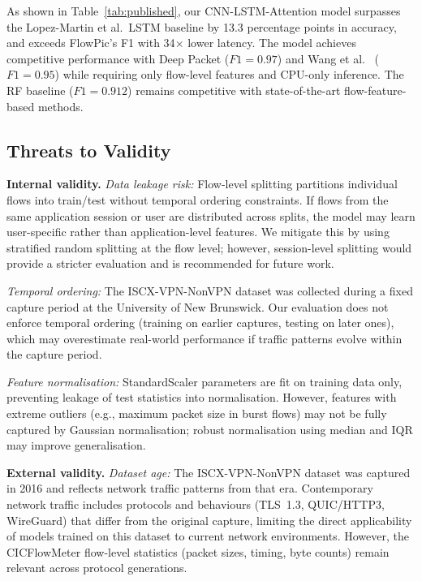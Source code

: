 \documentclass[conference]{IEEEtran}
\begin{document}
As shown in Table~\ref{tab:published}, our CNN-LSTM-Attention model surpasses
the Lopez-Martin et al.\ LSTM baseline \cite{lopezmartin2017} by 13.3 percentage
points in accuracy, and exceeds FlowPic's F1 \cite{shapira2021} with
34$\times$ lower latency. The model achieves competitive performance with
Deep Packet \cite{lotfollahi2020} ($F1 = 0.97$) and Wang et al.\ \cite{wang2024}
($F1 = 0.95$) while requiring only flow-level features and CPU-only inference.
The RF baseline ($F1 = 0.912$) remains competitive with state-of-the-art
flow-feature-based methods.

\subsection{Threats to Validity}
\label{ssec:threats}

\textbf{Internal validity.}
\textit{Data leakage risk:} Flow-level splitting partitions individual flows
into train/test without temporal ordering constraints. If flows from the same
application session or user are distributed across splits, the model may learn
user-specific rather than application-level features. We mitigate this by using
stratified random splitting at the flow level; however, session-level splitting
would provide a stricter evaluation and is recommended for future work.

\textit{Temporal ordering:} The ISCX-VPN-NonVPN dataset was collected during
a fixed capture period at the University of New Brunswick. Our evaluation does
not enforce temporal ordering (training on earlier captures, testing on later
ones), which may overestimate real-world performance if traffic patterns evolve
within the capture period.

\textit{Feature normalisation:} StandardScaler parameters are fit on training
data only, preventing leakage of test statistics into normalisation. However,
features with extreme outliers (e.g., maximum packet size in burst flows) may
not be fully captured by Gaussian normalisation; robust normalisation using
median and IQR may improve generalisation.

\textbf{External validity.}
\textit{Dataset age:} The ISCX-VPN-NonVPN dataset was captured in 2016 and
reflects network traffic patterns from that era. Contemporary network traffic
includes protocols and behaviours (TLS~1.3, QUIC/HTTP3, WireGuard) that
differ from the original capture, limiting the direct applicability of models
trained on this dataset to current network environments. However, the
CICFlowMeter flow-level statistics (packet sizes, timing, byte counts) remain
relevant across protocol generations.
\end{document}

